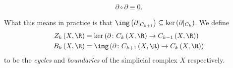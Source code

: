 \documentclass[10pt]{mypackage}
\begin{document}
\begin{proposition}
  \begin{align*}
    \partial\circ\partial \equiv 0.
  \end{align*}
\end{proposition}
What this means in practice is that $\img\left( \partial|_{C_{k+1}} \right)\subseteq \ker\left( \partial|_{C_k} \right)$. We define
\begin{align*}
  Z_k\left( X,\R \right) &= \ker\left( \partial\colon C_{k}\left( X,\R \right)\rightarrow C_{k-1}\left( X,\R \right) \right)\\
  B_k\left( X,\R \right) &= \img\left( \partial\colon C_{k+1}\left( X,\R \right)\rightarrow C_{k}\left( X,\R \right) \right)
\end{align*}
to be the \textit{cycles} and \textit{boundaries} of the simplicial complex $X$ respectively.\newline
\end{document}
